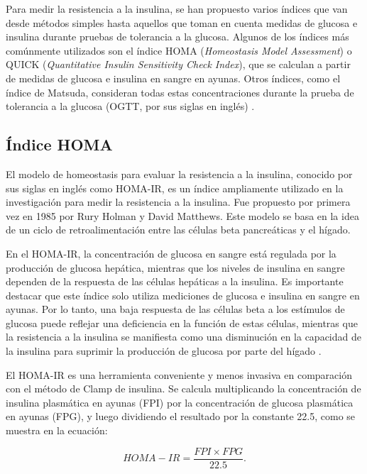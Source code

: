 Para medir la resistencia a la insulina, se han propuesto varios índices que van desde métodos simples hasta aquellos que toman en cuenta medidas de glucosa e insulina durante pruebas de tolerancia a la glucosa. Algunos de los índices más comúnmente utilizados son el índice HOMA (\textit{Homeostasis Model Assessment}) o QUICK (\textit{Quantitative Insulin Sensitivity Check Index}), que se calculan a partir de medidas de glucosa e insulina en sangre en ayunas. Otros índices, como el índice de Matsuda, consideran todas estas concentraciones durante la prueba de tolerancia a la glucosa (OGTT, por sus siglas en inglés) \cite{MedicionEstimacion}.




\subsection{Índice HOMA}

El modelo de homeostasis para evaluar la resistencia a la insulina, conocido por sus siglas en inglés como HOMA-IR, es un índice ampliamente utilizado en la investigación para medir la resistencia a la insulina. Fue propuesto por primera vez en 1985 por Rury Holman y David Matthews. Este modelo se basa en la idea de un ciclo de retroalimentación entre las células beta pancreáticas y el hígado.

En el HOMA-IR, la concentración de glucosa en sangre está regulada por la producción de glucosa hepática, mientras que los niveles de insulina en sangre dependen de la respuesta de las células hepáticas a la insulina. Es importante destacar que este índice solo utiliza mediciones de glucosa e insulina en sangre en ayunas. Por lo tanto, una baja respuesta de las células beta a los estímulos de glucosa puede reflejar una deficiencia en la función de estas células, mientras que la resistencia a la insulina se manifiesta como una disminución en la capacidad de la insulina para suprimir la producción de glucosa por parte del hígado \cite{indicesRes}.

El HOMA-IR es una herramienta conveniente y menos invasiva en comparación con el método de Clamp de insulina. Se calcula multiplicando la concentración de insulina plasmática en ayunas (FPI) por la concentración de glucosa plasmática en ayunas (FPG), y luego dividiendo el resultado por la constante 22.5, como se muestra en la ecuación:

\begin{equation}\label{HOMAIR}
    HOMA-IR = \frac{FPI \times FPG}{22.5}.
\end{equation}

